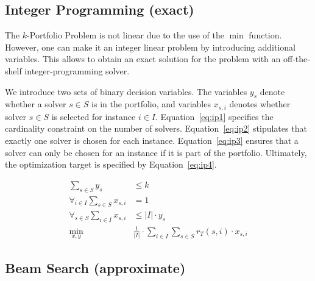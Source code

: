 \documentclass[conference]{IEEEtran}
\begin{document}
\subsection{Integer Programming (exact)}

The $k$-Portfolio Problem is not linear due to the use of the $\min$ function.
However, one can make it an integer linear problem by introducing additional variables.
This allows to obtain an exact solution for the problem with an off-the-shelf integer-programming solver.

We introduce two sets of binary decision variables. 
The variables $y_s$ denote whether a solver $s \in S$ is in the portfolio, and 
variables $x_{s,i}$ denotes whether solver $s \in S$ is selected for instance $i \in I$. 
Equation~\ref{eq:ip1} specifies the cardinality constraint on the number of solvers. 
Equation~\ref{eq:ip2} stipulates that exactly one solver is chosen for each instance. 
Equation~\ref{eq:ip3} ensures that a solver can only be chosen for an instance if it is part of the portfolio. 
Ultimately, the optimization target is specified by Equation~\ref{eq:ip4}. 

\begin{align}
	\sum_{s \in S} y_s &\leq k \label{eq:ip1}\\
	\forall_{i\in I} \sum_{s \in S} x_{s,i} &= 1 \label{eq:ip2}\\
	\forall_{s \in S} \sum_{i \in I} x_{s,i} &\leq |I| \cdot y_s \label{eq:ip3}\\
	\min_{x,y} \quad & \frac{1}{|I|} \cdot \sum_{i \in I} \sum_{s \in S} r_T(s,i) \cdot x_{s,i} \label{eq:ip4}
\end{align}


\subsection{Beam Search (approximate)}
\end{document}
